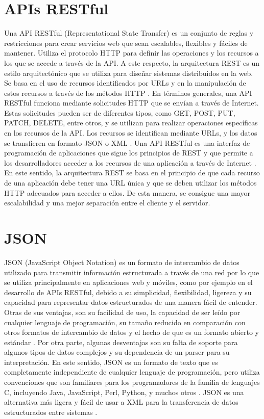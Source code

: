 \section{APIs RESTful}
Una API RESTful (Representational State Transfer) es un conjunto de reglas y restricciones para crear servicios web que sean escalables, flexibles y fáciles de mantener. Utiliza el protocolo HTTP para definir las operaciones y los recursos a los que se accede a través de la API. A este respecto, la arquitectura REST es un estilo arquitectónico que se utiliza para diseñar sistemas distribuidos en la web. Se basa en el uso de recursos identificados por URLs y en la manipulación de estos recursos a través de los métodos HTTP \cite{book:restful_webservices_richardson}.
En términos generales, una API RESTful funciona mediante solicitudes HTTP que se envían a través de Internet. Estas solicitudes pueden ser de diferentes tipos, como GET, POST, PUT, PATCH, DELETE, entre otros, y se utilizan para realizar operaciones específicas en los recursos de la API. Los recursos se identifican mediante URLs, y los datos se transfieren en formato JSON o XML \cite{art:google_app_engine}.
Una API RESTful es una interfaz de programación de aplicaciones que sigue los principios de REST y que permite a los desarrolladores acceder a los recursos de una aplicación a través de Internet \cite{art:architectural_styles}. En este sentido, la arquitectura REST se basa en el principio de que cada recurso de una aplicación debe tener una URL única y que se deben utilizar los métodos HTTP adecuados para acceder a ellos. De esta manera, se consigue una mayor escalabilidad y una mejor separación entre el cliente y el servidor.

\section{JSON}
JSON (JavaScript Object Notation) es un formato de intercambio de datos utilizado para transmitir información estructurada a través de una red por lo que se utiliza principalmente en aplicaciones web y móviles, como por ejemplo en el desarrollo de APIs RESTful, debido a su simplicidad, flexibilidad, ligereza y su capacidad para representar datos estructurados de una manera fácil de entender. 
Otras de sus ventajas, son su facilidad de uso, la capacidad de ser leído por cualquier lenguaje de programación, su tamaño reducido en comparación con otros formatos de intercambio de datos y el hecho de que es un formato abierto y estándar \cite{art:comparision_json_xml}. 
Por otra parte, algunas desventajas son su falta de soporte para algunos tipos de datos complejos y su dependencia de un parser para su interpretación.
En este sentido, JSON es un formato de texto que es completamente independiente de cualquier lenguaje de programación, pero utiliza convenciones que son familiares para los programadores de la familia de lenguajes C, incluyendo Java, JavaScript, Perl, Python, y muchos otros \cite{art:json_media_type}. JSON es una alternativa más ligera y fácil de usar a XML para la transferencia de datos estructurados entre sistemas \cite{art:google_app_engine}.

